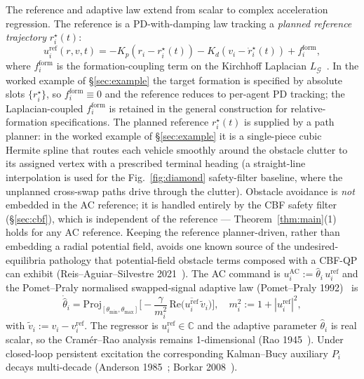 \documentclass[letterpaper,10pt,conference]{IEEEtran}
\newcommand{\Proj}{\mathrm{Proj}}
\newcommand{\thmin}{\theta_{\min}}
\newcommand{\thmax}{\theta_{\max}}
\newcommand{\thethat}{\hat\theta}
\renewcommand{\Re}{\mathrm{Re}}
\begin{document}
The reference and adaptive law extend \cite{maldonadoAnnaswamy2025} from scalar to complex acceleration regression. The reference is a PD-with-damping law tracking a \emph{planned reference trajectory} $r_i^\star(t)$:
\begin{equation}
u_i^{\text{ref}}(r,v,t) = -K_p (r_i - r_i^\star(t)) - K_d (v_i - \dot r_i^\star(t)) + f_i^{\text{form}},
\nonumber
\end{equation}
where $f_i^{\text{form}}$ is the formation-coupling term on the Kirchhoff Laplacian $L_{\mathcal{G}}$~\cite{kirchhoff1847}. In the worked example of \S\ref{sec:example} the target formation is specified by absolute slots $\{r_i^\star\}$, so $f_i^{\text{form}} \equiv 0$ and the reference reduces to per-agent PD tracking; the Laplacian-coupled $f_i^{\text{form}}$ is retained in the general construction for relative-formation specifications. The planned reference $r_i^\star(t)$ is supplied by a path planner: in the worked example of \S\ref{sec:example} it is a single-piece cubic Hermite spline that routes each vehicle smoothly around the obstacle clutter to its assigned vertex with a prescribed terminal heading (a straight-line interpolation is used for the Fig.~\ref{fig:diamond} safety-filter baseline, where the unplanned cross-swap paths drive through the clutter). Obstacle avoidance is \emph{not} embedded in the AC reference; it is handled entirely by the CBF safety filter (\S\ref{sec:cbf}), which is independent of the reference --- Theorem~\ref{thm:main}(1) holds for any AC reference. Keeping the reference planner-driven, rather than embedding a radial potential field, avoids one known source of the undesired-equilibria pathology that potential-field obstacle terms composed with a CBF-QP can exhibit (Reis--Aguiar--Silvestre 2021~\cite{reisAguiarSilvestre2021}). The AC command is
$u_i^{\text{AC}} := \thethat_i\,u_i^{\text{ref}}$ and the Pomet--Praly normalised swapped-signal adaptive law (Pomet--Praly 1992)~\cite{pometPraly1992} is
\begin{equation}
\dot{\thethat}_i = \Proj_{[\thmin, \thmax]}\!\Big[-\frac{\gamma}{m_i^2}\,\Re\!\big(\overline{u_i^{\text{ref}}}\,\tilde v_i\big)\Big],\quad m_i^2 := 1 + |u_i^{\text{ref}}|^2,
\nonumber
\end{equation}
with $\tilde v_i := v_i - v_i^{\text{ref}}$. The regressor is $u_i^{\text{ref}} \in \mathbb{C}$ and the adaptive parameter $\thethat_i$ is real scalar, so the Cram\'er--Rao analysis remains 1-dimensional (Rao 1945~\cite{rao1945}). Under closed-loop persistent excitation the corresponding Kalman--Bucy auxiliary $P_i$ decays multi-decade (Anderson 1985~\cite{anderson1985}; Borkar 2008~\cite{borkar2008}).
\end{document}
